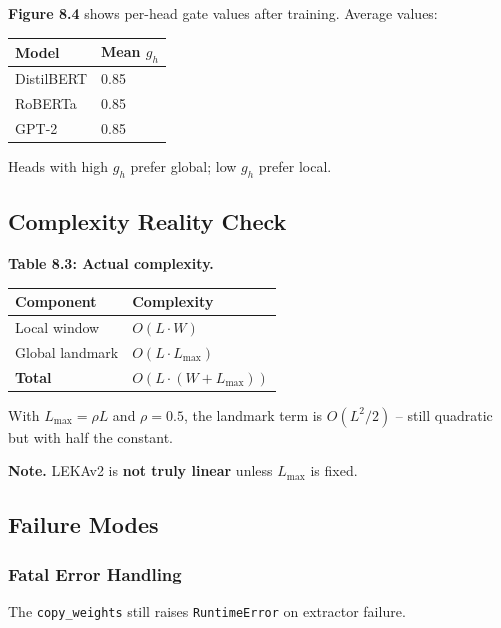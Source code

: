\textbf{Figure 8.4} shows per-head gate values after training. Average values:

\begin{table}[H]
\centering
\small
\begin{tabular}{ll}
\toprule
\textbf{Model} & \textbf{Mean $g_h$} \\
\midrule
DistilBERT & 0.85 \\
RoBERTa & 0.85 \\
GPT-2 & 0.85 \\
\bottomrule
\end{tabular}
\end{table}

Heads with high $g_h$ prefer global; low $g_h$ prefer local.

\subsection{Complexity Reality Check}

\textbf{Table 8.3: Actual complexity.}

\begin{table}[H]
\centering
\small
\begin{tabular}{ll}
\toprule
\textbf{Component} & \textbf{Complexity} \\
\midrule
Local window & $O(L \cdot W)$ \\
Global landmark & $O(L \cdot L_\text{max})$ \\
\textbf{Total} & \textbf{$O(L \cdot (W + L_\text{max}))$} \\
\bottomrule
\end{tabular}
\end{table}

With $L_\text{max} = \rho L$ and $\rho = 0.5$, the landmark term is 
$O(L^2 / 2)$ -- still quadratic but with half the constant.

\textbf{Note.} LEKAv2 is \textbf{not truly linear} unless $L_\text{max}$ is fixed.

\subsection{Failure Modes}

\subsubsection{Fatal Error Handling}

The \texttt{copy\_weights} still raises \texttt{RuntimeError} on extractor failure.

